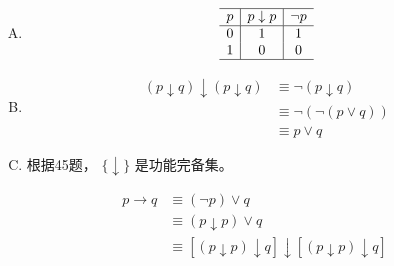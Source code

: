 {{        %
        \begin{practices}
            \begin{enumerate}[A.]
                \item
                {
                    \begin{table}[H]
                        \[
                            \begin{array}{c|c|c}
                                \hline
                                p & p \downarrow p & \neg p \\
                                \hline
                                0 & 1 & 1 \\
                                1 & 0 & 0 \\
                                \hline
                           \end{array}
                       \]
                    \end{table}
                }
                \item
                {
                    \begin{align*}
                        (p \downarrow q) \downarrow (p \downarrow q)
                        &\equiv \neg (p \downarrow q) \\
                        &\equiv \neg (\neg (p \vee q)) \\
                        &\equiv p \vee q
                    \end{align*}
                }
                \item
                {
                    根据45题， $\{\downarrow\}$ 是功能完备集。
                }
            \end{enumerate}
        \end{practices}

        \begin{practices}
            \begin{align*}
                p \rightarrow q
                &\equiv (\neg p) \vee q \\
                &\equiv (p \downarrow p) \vee q \\
                &\equiv [(p\downarrow p) \downarrow q] \downarrow [(p\downarrow p) \downarrow q]
            \end{align*}
        \end{practices}

}}

